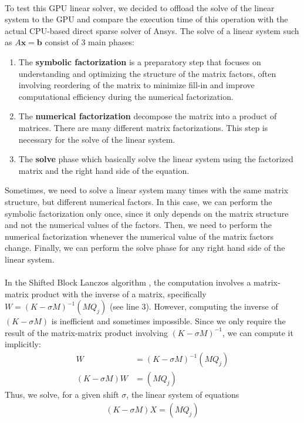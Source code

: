 \paragraph*{}
To test this GPU linear solver, we decided to offload the solve of the linear system to the GPU and compare the execution time of this operation with the actual CPU-based direct sparse solver of Ansys. The solve of a linear system such as $A\mathbf{x} = \mathbf{b}$ consist of 3 main phases:
\begin{enumerate}
    \item The \textbf{symbolic factorization} is a preparatory step that focuses on understanding and optimizing the structure of the matrix factors, often involving reordering of the matrix to minimize fill-in and improve computational efficiency during the numerical factorization.
    \item The \textbf{numerical factorization} decompose the matrix into a product of matrices. There are many different matrix factorizations. This step is necessary for the solve of the linear system.
    \item The \textbf{solve} phase which basically solve the linear system using the factorized matrix and the right hand side of the equation.
\end{enumerate}
Sometimes, we need to solve a linear system many times with the same matrix structure, but different numerical factors. In this case, we can perform the symbolic factorization only once, since it only depends on the matrix structure and not the numerical values of the factors. Then, we need to perform the numerical factorization whenever the numerical value of the matrix factors change. Finally, we can perform the solve phase for any right hand side of the linear system.

\paragraph*{}
In the Shifted Block Lanczos algorithm , the computation involves a matrix-matrix product with the inverse of a matrix, specifically $W = (K-\sigma M)^{-1}(MQ_j)$ (see line 3). However, computing the inverse of $(K-\sigma M)$ is inefficient and sometimes impossible. Since we only require the result of the matrix-matrix product involving $(K-\sigma M)^{-1}$, we can compute it implicitly:
\begin{align}
    W & = (K-\sigma M)^{-1}(MQ_j) \\ 
   (K-\sigma M) W & = (MQ_j)
\end{align}
Thus, we solve, for a given shift $\sigma$, the linear system of equations
\begin{align}
    (K-\sigma M) X = (MQ_j) \label{eq:lanc_solve}
\end{align}

